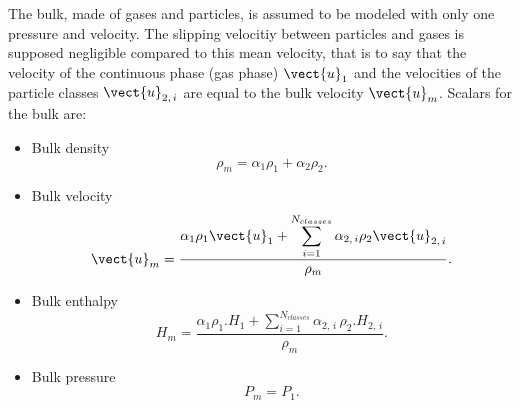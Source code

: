 The bulk, made of gases and particles, is assumed to be modeled with only one pressure and velocity. The slipping velocitiy between particles
and gases is supposed negligible compared to this mean velocity, that is to say that the velocity of the continuous phase (gas phase) $\vect{u}_1$ and the velocities of the particle classes $\vect{u}_{2, \, i}$ are equal to the bulk velocity $\vect{u}_m$.
Scalars for the bulk are:
\begin{itemize}
  \item Bulk density
     \begin{equation}
        \rho_{m} = \alpha_{1}\rho_{1} + \alpha_{2}\rho_{2}.
     \end{equation}

  \item Bulk velocity
     \begin{equation}
       \vect{u}_{m} = \dfrac{ \alpha_{1}\rho_{1} \vect{u}_{1}
                    + \displaystyle \sum_{i=1}^{N_{classes}}\alpha_{2, \, i}\rho_{2} \vect{u}_{2, \, i} }{\rho_{m}}.
     \end{equation}

  \item Bulk enthalpy
     \begin{equation}
        H_{m} = \dfrac{ \alpha_{1}\rho_{1}.H_{1}
                     + \displaystyle \sum_{i=1}^{N_{classes}}\alpha_{2, \, i} \,\rho_{2}.H_{2, \, i} }{\rho_{m}}.
     \end{equation}

  \item Bulk pressure
     \begin{equation}
       P_{m} = P_{1}.
     \end{equation}
\end{itemize}

